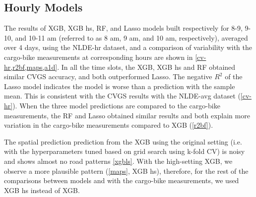 \documentclass{article}
\begin{document}
 
 

 
 
\subsection{Hourly Models}
The results of XGB, XGB hs, RF, and Lasso models built respectively for 8-9, 9-10, and 10-11 am (referred to as 8 am, 9 am, and 10 am, respectively), averaged over 4 days, using the NLDE-hr dataset, and a comparison of variability with the cargo-bike measurements at corresponding hours are shown in \cref{cv-hr,r2bf,maps,a1d}. 
In all the time slots, the XGB, XGB hs and RF obtained similar CVGS accuracy, and both outperformed Lasso. The negative $R^2$ of the Lasso model indicates the model is worse than a prediction with the sample mean. This is consistent with the CVGS results with the NLDE-avg dataset (\cref{cv-hr}). When the three model predictions are compared to the cargo-bike measurements, the RF and Lasso obtained similar results and both explain more variation in the cargo-bike measurements compared to XGB (\cref{r2bf}).  

 The spatial prediction prediction from the XGB using the original setting (i.e. with the hyperparameters tuned based on grid search using k-fold CV) is noisy and shows almost no road patterns \cref{xgbls}. With the high-setting XGB, we observe a more plausible pattern (\cref{maps}, XGB hs), therefore, for the rest of the comparisons between models and with the cargo-bike measurements, we used XGB hs instead of XGB. 
 
\end{document}
